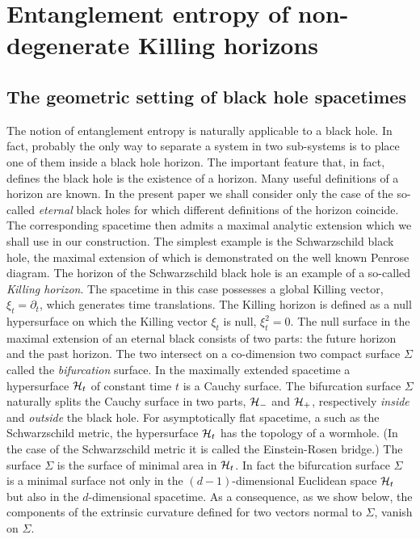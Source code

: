 \documentclass[12pt]{article}
\begin{document}
\section{Entanglement entropy of non-degenerate  Killing horizons}


\subsection{The geometric setting of black hole spacetimes}
The notion of entanglement entropy is naturally applicable to a black hole.  In fact, probably the only way to  separate a system in two sub-systems is to place  one of them inside  a black hole horizon. The important feature that, in fact, defines the black hole is the existence of a horizon. Many useful definitions of a horizon are known.  In the present paper we shall consider only the case of the so-called {\it eternal} black holes for which different definitions  of the horizon coincide. The corresponding spacetime then admits a maximal analytic extension which we shall use in our construction. The simplest example is the Schwarzschild black hole,
the maximal extension of which is demonstrated on the well known Penrose diagram.    The horizon of the Schwarzschild black hole is an example of a so-called {\it Killing horizon}. 
The spacetime in this case possesses a global Killing vector, $\xi_t=\partial_t$, which generates  time translations. The Killing horizon is defined as a null hypersurface on which the Killing vector $\xi_t$ is null, $\xi_t^2=0$.  The null surface in the maximal extension of an eternal black 
consists of two parts: the future horizon and the past horizon. The two intersect on a co-dimension two compact surface $\Sigma$ called the {\it bifurcation} surface. In the maximally extended spacetime a hypersurface ${\cal H}_t$ of constant time $t$ is  a Cauchy  surface. 
The bifurcation surface $\Sigma$ naturally splits the Cauchy surface in two parts, ${\cal H}_-$ and ${\cal H}_+$, respectively {\it inside} and {\it outside} the black hole. For asymptotically flat spacetime, a such as the Schwarzschild metric, the hypersurface ${\cal H}_t$ has the topology of a wormhole.
(In the case of the Schwarzschild metric it is called the Einstein-Rosen bridge.) The surface $\Sigma$ is the surface of minimal area in ${\cal H}_t$.
In fact the bifurcation surface $\Sigma$ is a minimal surface not only in the $(d-1)$-dimensional Euclidean space ${\cal H}_t$ but also in the $d$-dimensional spacetime. As a consequence, as we show below, the components of the extrinsic curvature  defined for two vectors normal to $\Sigma$, vanish
on $\Sigma$.
\end{document}
